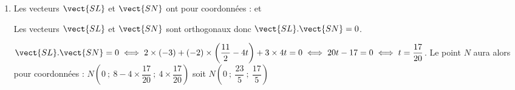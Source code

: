 \begin{enumerate}
	On remarque alors que $\vect{DN}=t\times \vect{DK}$. Les deux vecteurs sont donc colinéaires, donc les points $D, K$ et $N$ sont alignés.
	
	Pour vérifier que $N$ est un point du segment $[DK]$, montrons que $\vect{NK}.\vect{ND}\leqslant 0$ :
	
	 et  
	
	donc $\vect{NK}.\vect{ND}=0\times 0+(-4+4t)\times 4t+(4-4t)\times (-4t) =32t^2-32t =32t(t-1)$.
	
	$t\in [0~;~1]$ donc $32t(t-1)\leqslant 0$ donc $N$ est un point du segment $[DK]$.
	\item Les vecteurs $\vect{SL}$ et $\vect{SN}$ ont pour coordonnées :  et 
	
Les vecteurs $\vect{SL}$ et $\vect{SN}$ sont orthogonaux donc $\vect{SL}.\vect{SN}=0$.
	
	$\vect{SL}.\vect{SN}=0 \iff 2\times(-3)+(-2)\times \left(\dfrac{11}{2}-4t\right)+3\times 4t=0 \iff 20t-17=0 \iff t=\dfrac{17}{20}$.
	Le point $N$ aura alors pour coordonnées : $N\left(0~;~8-4\times\dfrac{17}{20}~;~4\times \dfrac{17}{20} \right)$ soit $N\left(0~;~\dfrac{23}{5}~;~\dfrac{17}{5} \right)$
	\end{enumerate}

\bigskip

